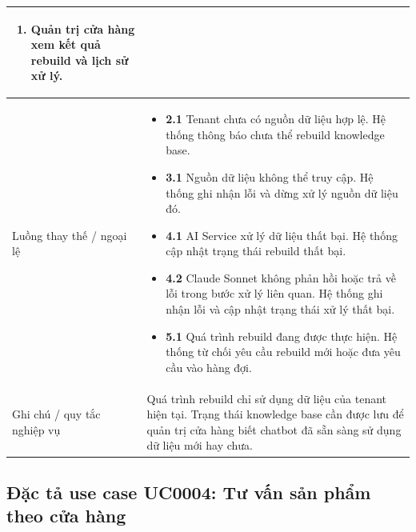 \documentclass[../DoAn.tex]{subfiles}
\begin{document}
\begin{longtable}{|p{}|p{}|}
\begin{minipage}[t]{0.68\textwidth}
\begin{enumerate}
    \item Quản trị cửa hàng xem kết quả rebuild và lịch sử xử lý.
\end{enumerate}
\end{minipage}
\\
\hline
Luồng thay thế / ngoại lệ &
\begin{minipage}[t]{0.68\textwidth}
\begin{itemize}
    \item \textbf{2.1} Tenant chưa có nguồn dữ liệu hợp lệ. Hệ thống thông báo chưa thể rebuild knowledge base.
    \item \textbf{3.1} Nguồn dữ liệu không thể truy cập. Hệ thống ghi nhận lỗi và dừng xử lý nguồn dữ liệu đó.
    \item \textbf{4.1} AI Service xử lý dữ liệu thất bại. Hệ thống cập nhật trạng thái rebuild thất bại.
    \item \textbf{4.2} Claude Sonnet không phản hồi hoặc trả về lỗi trong bước xử lý liên quan. Hệ thống ghi nhận lỗi và cập nhật trạng thái xử lý thất bại.
    \item \textbf{5.1} Quá trình rebuild đang được thực hiện. Hệ thống từ chối yêu cầu rebuild mới hoặc đưa yêu cầu vào hàng đợi.
\end{itemize}
\end{minipage}
\\
\hline
Ghi chú / quy tắc nghiệp vụ & Quá trình rebuild chỉ sử dụng dữ liệu của tenant hiện tại. Trạng thái knowledge base cần được lưu để quản trị cửa hàng biết chatbot đã sẵn sàng sử dụng dữ liệu mới hay chưa. \\
\hline
\end{longtable}

\subsection{Đặc tả use case UC0004: Tư vấn sản phẩm theo cửa hàng}
\label{subsection:2.3.4}
\end{document}

